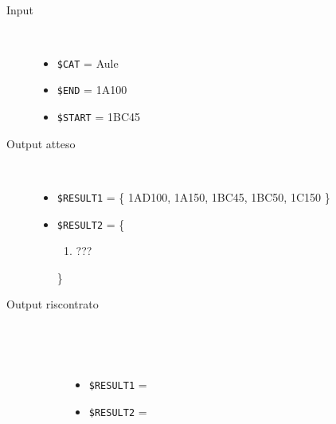 \documentclass[../../Sperimentazione.tex]{subfiles}
\begin{document}
			\paragraph*{}
			\label{Prova1D.1}
			\begin{tcolorbox}[fonttitle=\bfseries, 
								adjusted title={\Large Prova 1D.1}, 
								breakable, 
								sharp corners=south,
								colback=white, 
								colframe=white!60!black]
								
				\begin{description}%
				
					\item[Input] \ \par 
        				\begin{itemize}
        					\item \verb|$CAT| = Aule
							\item \verb|$END| = 1A100
							\item \verb|$START| = 1BC45
        				\end{itemize}
        				
        			\tcbline 
        				
        			\item[Output atteso] \ \par
        				\begin{itemize}
        				
        					\item \verb|$RESULT1| = \{
        						1AD100, 1A150, 1BC45, 1BC50, 1C150
        					\}
        				
        					\item \verb|$RESULT2| = \{
        					\begin{enumerate}
        						\item ???
        					\end{enumerate}
        					\}
        					
        				\end{itemize}

					\tcbline				
        				
        			\item[Output riscontrato] \ \par
        				\begin{description}
        				
        					\item[\dispositivoA] \ \par
        					\begin{itemize}
        						\item \verb|$RESULT1| = \ok
        						\item \verb|$RESULT2| = \ok
        					\end{itemize}      					
        					

\end{description}
\end{description}
\end{tcolorbox}
\end{document}
